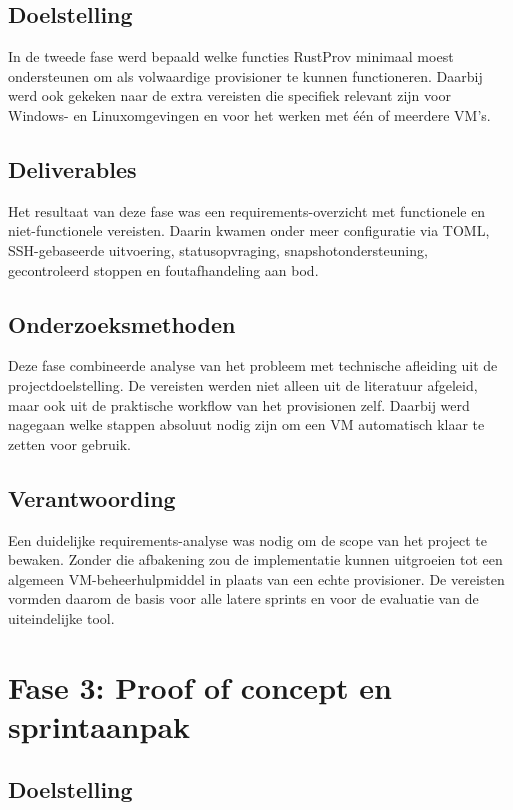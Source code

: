 \subsection{Doelstelling}

In de tweede fase werd bepaald welke functies RustProv minimaal moest ondersteunen om als volwaardige provisioner te kunnen functioneren. Daarbij werd ook gekeken naar de extra vereisten die specifiek relevant zijn voor Windows- en Linuxomgevingen en voor het werken met één of meerdere VM’s. 

\subsection{Deliverables}

Het resultaat van deze fase was een requirements-overzicht met functionele en niet-functionele vereisten. Daarin kwamen onder meer configuratie via TOML, SSH-gebaseerde uitvoering, statusopvraging, snapshotondersteuning, gecontroleerd stoppen en foutafhandeling aan bod.

\subsection{Onderzoeksmethoden}

Deze fase combineerde analyse van het probleem met technische afleiding uit de projectdoelstelling. De vereisten werden niet alleen uit de literatuur afgeleid, maar ook uit de praktische workflow van het provisionen zelf. Daarbij werd nagegaan welke stappen absoluut nodig zijn om een VM automatisch klaar te zetten voor gebruik. 

\subsection{Verantwoording}

Een duidelijke requirements-analyse was nodig om de scope van het project te bewaken. Zonder die afbakening zou de implementatie kunnen uitgroeien tot een algemeen VM-beheerhulpmiddel in plaats van een echte provisioner. De vereisten vormden daarom de basis voor alle latere sprints en voor de evaluatie van de uiteindelijke tool. 

\section{Fase 3: Proof of concept en sprintaanpak}

\subsection{Doelstelling}

